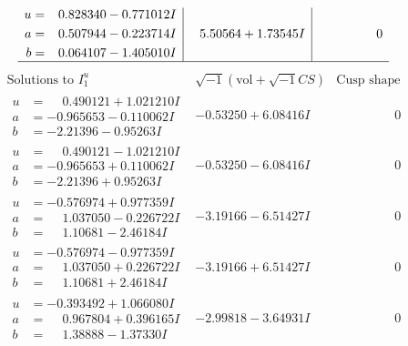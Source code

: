 \documentclass[1p]{elsarticle_modified}
\theoremstyle{definition}
\newcommand{\I}{\sqrt{-1}}
\begin{document}
$$\begin{array}{c|c|c}
\begin{aligned}
u &= \phantom{-}0.828340 - 0.771012 I \\
a &= \phantom{-}0.507944 - 0.223714 I \\
b &= \phantom{-}0.064107 - 1.405010 I\end{aligned}
 & \phantom{-}5.50564 + 1.73545 I & \phantom{-0.000000 } 0\\
 \hline 
 \end{array}$$\newpage$$\begin{array}{c|c|c}  
\text{Solutions to }I^u_{1}& \I (\text{vol} + \sqrt{-1}CS) & \text{Cusp shape}\\
 \hline 
\begin{aligned}
u &= \phantom{-}0.490121 + 1.021210 I \\
a &= -0.965653 - 0.110062 I \\
b &= -2.21396 - 0.95263 I\end{aligned}
 & -0.53250 + 6.08416 I & \phantom{-0.000000 } 0 \\ \hline\begin{aligned}
u &= \phantom{-}0.490121 - 1.021210 I \\
a &= -0.965653 + 0.110062 I \\
b &= -2.21396 + 0.95263 I\end{aligned}
 & -0.53250 - 6.08416 I & \phantom{-0.000000 } 0 \\ \hline\begin{aligned}
u &= -0.576974 + 0.977359 I \\
a &= \phantom{-}1.037050 - 0.226722 I \\
b &= \phantom{-}1.10681 - 2.46184 I\end{aligned}
 & -3.19166 - 6.51427 I & \phantom{-0.000000 } 0 \\ \hline\begin{aligned}
u &= -0.576974 - 0.977359 I \\
a &= \phantom{-}1.037050 + 0.226722 I \\
b &= \phantom{-}1.10681 + 2.46184 I\end{aligned}
 & -3.19166 + 6.51427 I & \phantom{-0.000000 } 0 \\ \hline\begin{aligned}
u &= -0.393492 + 1.066080 I \\
a &= \phantom{-}0.967804 + 0.396165 I \\
b &= \phantom{-}1.38888 - 1.37330 I\end{aligned}
 & -2.99818 - 3.64931 I & \phantom{-0.000000 } 0 \\ \hline\begin{aligned}

\end{aligned}
\end{array}$$
\end{document}
